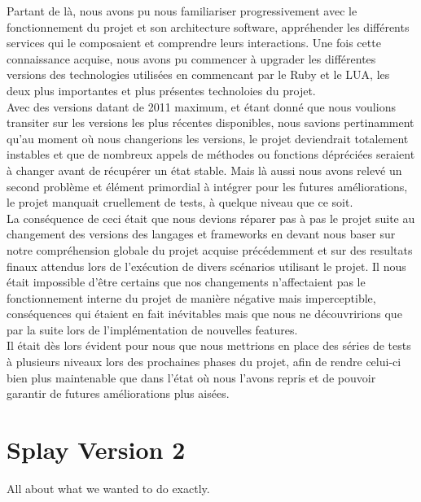 \documentclass{eplmastersthesis}
\begin{document}
        Partant de là, nous avons pu nous familiariser progressivement avec
        le fonctionnement du projet et son architecture software, appréhender
        les différents services qui le composaient et comprendre leurs
        interactions. Une fois cette connaissance acquise, nous avons pu
        commencer à upgrader les différentes versions des technologies
        utilisées en commencant par le Ruby et le LUA, les deux plus importantes
        et plus présentes technoloies du projet.\\
        Avec des versions datant de 2011 maximum, et étant donné que nous voulions
        transiter sur les versions les plus récentes disponibles, nous savions
        pertinamment qu'au moment où nous changerions les versions, le projet
        deviendrait totalement instables et que de nombreux appels de méthodes
        ou fonctions dépréciées seraient à changer avant de récupérer un état
        stable. Mais là aussi nous avons relevé un second problème et élément
        primordial à intégrer pour les futures améliorations, le projet
        manquait cruellement de tests, à quelque niveau que ce soit.\\
        La conséquence de ceci était que nous devions réparer pas à pas le
        projet suite au changement des versions des langages et frameworks en
        devant nous baser sur notre compréhension globale du projet acquise
        précédemment et sur des resultats finaux attendus lors de l'exécution
        de divers scénarios utilisant le projet. Il nous était impossible d'être
        certains que nos changements n'affectaient pas le fonctionnement interne
        du projet de manière négative mais imperceptible, conséquences qui
        étaient en fait inévitables mais que nous ne découvririons que par
        la suite lors de l'implémentation de nouvelles features.\\
        Il était dès lors évident pour nous que nous mettrions en place des
        séries de tests à plusieurs niveaux lors des prochaines phases du
        projet, afin de rendre celui-ci bien plus maintenable que dans l'état
        où nous l'avons repris et de pouvoir garantir de futures améliorations
        plus aisées.\\


  \chapter{Splay Version 2}

    All about what we wanted to do exactly.
\end{document}

